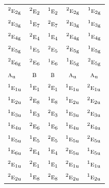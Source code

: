 \documentclass[10pt,a4paper]{article}
\numberwithin{equation}{section}
\newcommand{\irr}[1]{\text{\normalfont\scshape #1}}
\newcommand{\conjpair}[1]{{}^{#1}}
\newcommand{\ptag}[1]{\mathrm{#1}}
\begin{document}
{\begin{longtable}{@{}lcccc@{}}
$\conjpair{2}\irr{e}_{2\ptag{g}}$ & $\conjpair{2}\irr{e}_{2}$ & $\conjpair{1}\irr{e}_{2}$ & $\conjpair{2}\irr{e}_{2\ptag{g}}$ & $\conjpair{1}\irr{e}_{2\ptag{g}}$\\
$\conjpair{2}\irr{e}_{3\ptag{g}}$ & $\conjpair{1}\irr{e}_{7}$ & $\conjpair{2}\irr{e}_{7}$ & $\conjpair{2}\irr{e}_{3\ptag{g}}$ & $\conjpair{1}\irr{e}_{3\ptag{g}}$\\
$\conjpair{2}\irr{e}_{4\ptag{g}}$ & $\conjpair{2}\irr{e}_{4}$ & $\conjpair{1}\irr{e}_{4}$ & $\conjpair{2}\irr{e}_{4\ptag{g}}$ & $\conjpair{1}\irr{e}_{4\ptag{g}}$\\
$\conjpair{2}\irr{e}_{5\ptag{g}}$ & $\conjpair{1}\irr{e}_{5}$ & $\conjpair{2}\irr{e}_{5}$ & $\conjpair{2}\irr{e}_{5\ptag{g}}$ & $\conjpair{1}\irr{e}_{5\ptag{g}}$\\
$\conjpair{2}\irr{e}_{6\ptag{g}}$ & $\conjpair{2}\irr{e}_{6}$ & $\conjpair{1}\irr{e}_{6}$ & $\conjpair{1}\irr{e}_{5\ptag{g}}$ & $\conjpair{2}\irr{e}_{5\ptag{g}}$\\
$\irr{a}_{\ptag{u}}$ & $\irr{b}$ & $\irr{b}$ & $\irr{a}_{\ptag{u}}$ & $\irr{a}_{\ptag{u}}$\\
$\conjpair{1}\irr{e}_{1\ptag{u}}$ & $\conjpair{1}\irr{e}_{1}$ & $\conjpair{2}\irr{e}_{1}$ & $\conjpair{1}\irr{e}_{1\ptag{u}}$ & $\conjpair{2}\irr{e}_{1\ptag{u}}$\\
$\conjpair{1}\irr{e}_{2\ptag{u}}$ & $\conjpair{2}\irr{e}_{8}$ & $\conjpair{1}\irr{e}_{8}$ & $\conjpair{1}\irr{e}_{2\ptag{u}}$ & $\conjpair{2}\irr{e}_{2\ptag{u}}$\\
$\conjpair{1}\irr{e}_{3\ptag{u}}$ & $\conjpair{1}\irr{e}_{3}$ & $\conjpair{2}\irr{e}_{3}$ & $\conjpair{1}\irr{e}_{3\ptag{u}}$ & $\conjpair{2}\irr{e}_{3\ptag{u}}$\\
$\conjpair{1}\irr{e}_{4\ptag{u}}$ & $\conjpair{2}\irr{e}_{6}$ & $\conjpair{1}\irr{e}_{6}$ & $\conjpair{1}\irr{e}_{4\ptag{u}}$ & $\conjpair{2}\irr{e}_{4\ptag{u}}$\\
$\conjpair{1}\irr{e}_{5\ptag{u}}$ & $\conjpair{1}\irr{e}_{5}$ & $\conjpair{2}\irr{e}_{5}$ & $\conjpair{1}\irr{e}_{5\ptag{u}}$ & $\conjpair{2}\irr{e}_{5\ptag{u}}$\\
$\conjpair{1}\irr{e}_{6\ptag{u}}$ & $\conjpair{2}\irr{e}_{4}$ & $\conjpair{1}\irr{e}_{4}$ & $\conjpair{2}\irr{e}_{5\ptag{u}}$ & $\conjpair{1}\irr{e}_{5\ptag{u}}$\\
$\conjpair{2}\irr{e}_{1\ptag{u}}$ & $\conjpair{2}\irr{e}_{1}$ & $\conjpair{1}\irr{e}_{1}$ & $\conjpair{2}\irr{e}_{1\ptag{u}}$ & $\conjpair{1}\irr{e}_{1\ptag{u}}$\\
$\conjpair{2}\irr{e}_{2\ptag{u}}$ & $\conjpair{1}\irr{e}_{8}$ & $\conjpair{2}\irr{e}_{8}$ & $\conjpair{2}\irr{e}_{2\ptag{u}}$ & $\conjpair{1}\irr{e}_{2\ptag{u}}$\\

\end{longtable}}
\end{document}
